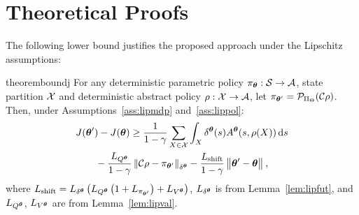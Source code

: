 \chapter{Theoretical Proofs}

The following lower bound
justifies the proposed approach under the Lipschitz assumptions:
%
\begin{restatable}{theorem}{boundj}\label{lem:boundj}
	For any deterministic parametric policy ${\pi_{\vtheta}:\Sspace\to\Aspace}$, state partition $\Xspace$ and deterministic abstract policy ${\rho:\Xspace\to\Aspace}$, let $\pi_{\vtheta'} = \Proj_{\Pi_{\Theta}}(\Conc\rho)$. Then, under Assumptions~\ref{ass:lipmdp} and~\ref{ass:lippol}:
	\begin{align*}
	&J(\vtheta') - J(\vtheta) \geq \frac{1}{1-\gamma}\sum_{X\in\Xspace}\int_{X}\delta^{\vtheta}(s)A^{\vtheta}(s,\rho(X)) \de s 
	\nonumber\\&\qquad- \frac{L_{Q^{\vtheta}}}{1-\gamma}\norm[\delta^{\vtheta}]{\Conc\rho - \pi_{\vtheta'}} 
	-\frac{L_{\text{shift}}}{1-\gamma} \norm{\vtheta'-\vtheta},
	\end{align*}
	where $L_{\text{shift}}=L_{\delta^{\vtheta}}\left(L_{Q^{\vtheta}}\left(1+L_{\pi_{\vtheta'}}\right)+L_{V^{\vtheta}}\right)$, $L_{\delta^{\vtheta}}$ is from Lemma~\ref{lem:lipfut}, and $L_{Q^{\vtheta}}$, $L_{V^{\vtheta}}$ are from Lemma~\ref{lem:lipval}. 
\end{restatable}

